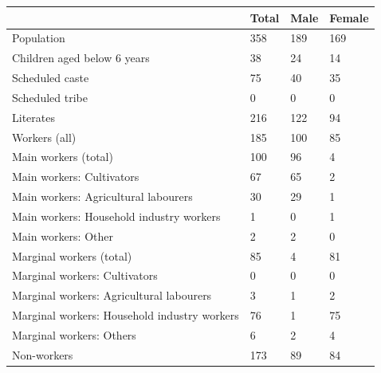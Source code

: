 \documentclass{article}
\begin{document}
\begin{tabular}{llll}
\toprule
 & Total & Male & Female \\
\midrule
Population & 358 & 189 & 169 \\
Children aged below 6 years & 38 & 24 & 14 \\
Scheduled caste & 75 & 40 & 35 \\
Scheduled tribe & 0 & 0 & 0 \\
Literates & 216 & 122 & 94 \\
Workers (all) & 185 & 100 & 85 \\
Main workers (total) & 100 & 96 & 4 \\
Main workers: Cultivators & 67 & 65 & 2 \\
Main workers: Agricultural labourers & 30 & 29 & 1 \\
Main workers: Household industry workers & 1 & 0 & 1 \\
Main workers: Other & 2 & 2 & 0 \\
Marginal workers (total) & 85 & 4 & 81 \\
Marginal workers: Cultivators & 0 & 0 & 0 \\
Marginal workers: Agricultural labourers & 3 & 1 & 2 \\
Marginal workers: Household industry workers & 76 & 1 & 75 \\
Marginal workers: Others & 6 & 2 & 4 \\
Non-workers & 173 & 89 & 84 \\
\bottomrule
\end{tabular}
\end{document}
